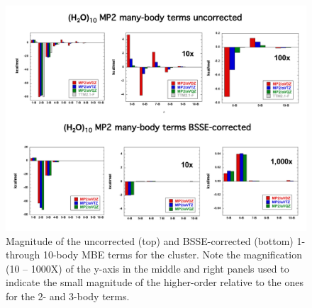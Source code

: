\documentclass[11pt, proquest]{uwthesis}[2020/02/24]
\let\ce\ch
\begin{document}
\begin{figure}[t]
\uwsinglespace
\centering
\includegraphics[width=\textwidth]{Figures/Chapter_2/W10_MP2_MB.pdf}
\caption[Magnitude of the uncorrected (top) and BSSE-corrected (bottom) 1- through 10-body MBE terms for the \ce{(H2O)_{10}} cluster. Note the magnification (10 – 1000X) of the y-axis in the middle and right panels used to indicate the small magnitude of the higher-order relative to the ones for the 2- and 3-body terms.]{Magnitude of the uncorrected (top) and BSSE-corrected (bottom) 1- through 10-body MBE terms for the \ce{(H2O)_{10}} cluster. Note the magnification (10 – 1000X) of the y-axis in the middle and right panels used to indicate the small magnitude of the higher-order relative to the ones for the 2- and 3-body terms.}
\label{fig:MBE_I_F2}
\end{figure}
\end{document}
